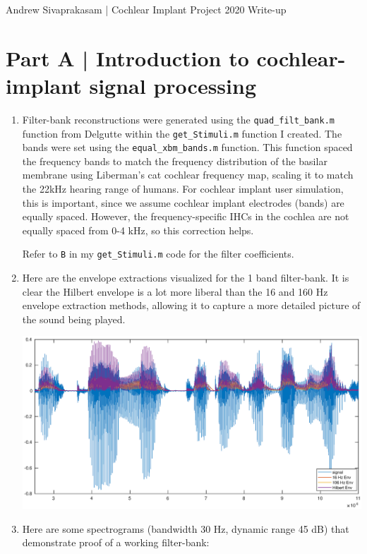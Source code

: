 \documentclass[9pt]{extarticle}
\begin{document}
{\huge Andrew Sivaprakasam | Cochlear Implant Project 2020 Write-up}

\section{Part A | Introduction to cochlear-implant signal processing}

\begin{enumerate}[label = \alph*) ]
\item Filter-bank reconstructions were generated using the \verb|quad_filt_bank.m| function from Delgutte within the \verb|get_Stimuli.m| function I created. The bands were set using the \verb|equal_xbm_bands.m| function. This function spaced the frequency bands to match the frequency distribution of the basilar membrane using Liberman's cat cochlear frequency map, scaling it to match the 22kHz hearing range of humans. For cochlear implant user simulation, this is important, since we assume cochlear implant electrodes (bands) are equally spaced. However, the frequency-specific IHCs in the cochlea are not equally spaced from 0-4 kHz, so this correction helps.  

\vspace{.5em}

Refer to \verb|B| in my \verb|get_Stimuli.m| code for the filter coefficients. 

\item Here are the envelope extractions visualized for the 1 band filter-bank. It is clear the Hilbert envelope is a lot more liberal than the 16 and 160 Hz envelope extraction methods, allowing it to capture a more detailed picture of the sound being played. 

\begin{center}
\includegraphics[width = .85\textwidth]{envelopes}
\end{center}

\item Here are some spectrograms (bandwidth 30 Hz, dynamic range 45 dB) that demonstrate proof of a working filter-bank: \\


\end{enumerate}
\end{document}
